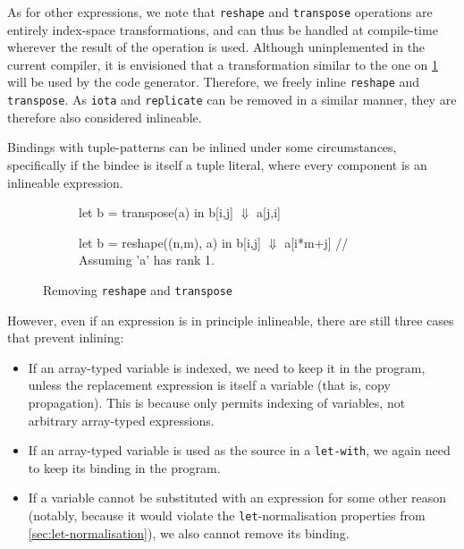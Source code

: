 As for other expressions, we note that \texttt{reshape} and
\texttt{transpose} operations are entirely index-space
transformations, and can thus be handled at compile-time wherever the
result of the operation is used.  Although uninplemented in the
current \LO{} compiler, it is envisioned that a transformation similar
to the one on \cref{fig:removing-reshape-transpose} will be used by
the code generator.  Therefore, we freely inline \texttt{reshape} and
\texttt{transpose}.  As \texttt{iota} and \texttt{replicate} can be
removed in a similar manner, they are therefore also considered
inlineable.

Bindings with tuple-patterns can be inlined under some circumstances,
specifically if the bindee is itself a tuple literal, where every
component is an inlineable expression.

\begin{figure}
\centering
\begin{subfigure}[t]{.4\textwidth}
\centering
\begin{colorcode}
let b = transpose(a) in
b[i,j]
  \(\Downarrow\)
a[j,i]
\end{colorcode}
\end{subfigure}%
\begin{subfigure}[t]{.5\textwidth}
\centering
\begin{colorcode}
let b = reshape((n,m), a) in
b[i,j]
  \(\Downarrow\)
a[i*m+j] // Assuming 'a' has rank 1.
\end{colorcode}
\end{subfigure}%
\caption{Removing \texttt{reshape} and \texttt{transpose}}
\label{fig:removing-reshape-transpose}
\end{figure}

However, even if an expression is in principle inlineable, there are
still three cases that prevent inlining:

\begin{itemize}
\item If an array-typed variable is indexed, we need to keep it in the
  program, unless the replacement expression is itself a variable
  (that is, copy propagation).  This is because \LO{} only permits
  indexing of variables, not arbitrary array-typed expressions.

\item If an array-typed variable is used as the source in a
  \texttt{let-with}, we again need to keep its binding in the program.

\item If a variable cannot be substituted with an expression for some
  other reason (notably, because it would violate the
  \texttt{let}-normalisation properties from
  \cref{sec:let-normalisation}), we also cannot remove its binding.
\end{itemize}

